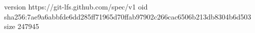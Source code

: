 version https://git-lfs.github.com/spec/v1
oid sha256:7ae9a6abbfde6dd285ff71965d70ffab97902c266cac6506b213db8304b6d503
size 247945
